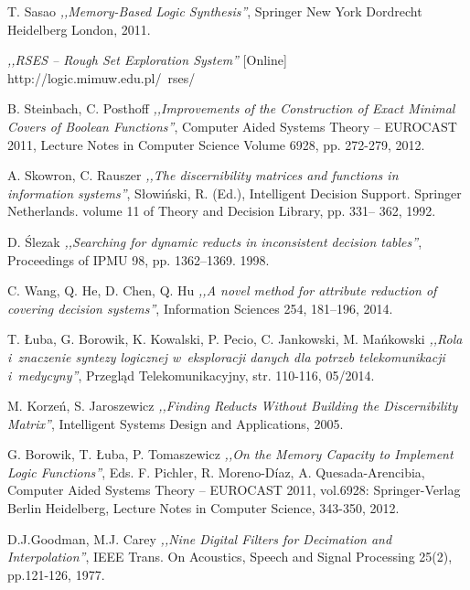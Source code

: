 \begin{thebibliography}{99}
 T. Sasao \emph{,,Memory-Based Logic Synthesis''}, Springer New York Dordrecht Heidelberg London, 2011.

 \emph{,,RSES – Rough Set Exploration System''} [Online] http://logic.mimuw.edu.pl/~rses/

 B. Steinbach, C. Posthoff \emph{,,Improvements of the Construction of Exact Minimal Covers of Boolean Functions''}, Computer Aided Systems Theory – EUROCAST 2011, Lecture Notes in Computer Science Volume 6928, pp. 272-279, 2012.

 A. Skowron, C. Rauszer \emph{,,The discernibility matrices and functions in information systems''}, Słowiński, R. (Ed.), Intelligent Decision Support. Springer Netherlands. volume 11 of Theory and Decision Library, pp. 331– 362, 1992.

 D. Ślezak \emph{,,Searching for dynamic reducts in inconsistent decision tables''}, Proceedings of IPMU 98, pp. 1362–1369. 1998.

 C. Wang, Q. He, D. Chen, Q. Hu \emph{,,A novel method for attribute reduction of covering decision systems''}, Information Sciences 254, 181–196, 2014.

 T. Łuba, G. Borowik, K. Kowalski, P. Pecio, C. Jankowski, M. Mańkowski \emph{,,Rola i~znaczenie syntezy logicznej w~eksploracji danych dla potrzeb telekomunikacji i~medycyny''}, Przegląd Telekomunikacyjny, str. 110-116, 05/2014.

 M. Korzeń, S. Jaroszewicz \emph{,,Finding Reducts Without Building the Discernibility Matrix''}, Intelligent Systems Design and Applications, 2005.

 G. Borowik, T. Łuba, P. Tomaszewicz \emph{,,On the Memory Capacity to Implement Logic Functions''}, Eds. F. Pichler, R. Moreno-Díaz, A. Quesada-Arencibia, Computer Aided Systems Theory – EUROCAST 2011, vol.6928: Springer-Verlag Berlin Heidelberg, Lecture Notes in Computer Science, 343-350, 2012.

 D.J.Goodman, M.J. Carey \emph{,,Nine Digital Filters for Decimation and Interpolation''}, IEEE Trans. On Acoustics, Speech and Signal Processing 25(2), pp.121-126, 1977.


\end{thebibliography}
